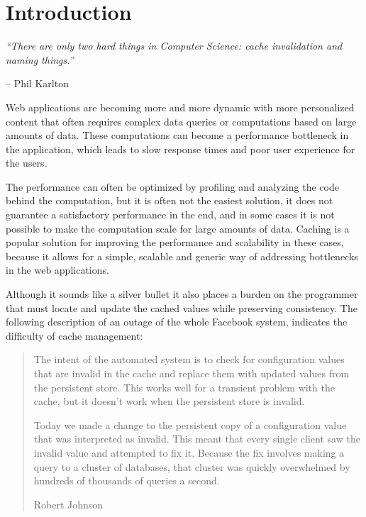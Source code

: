 \chapter{Introduction}

\emph{``There are only two hard things in Computer Science: cache invalidation and naming things.''} \vspace{-1cm}
\begin{flushright}-- Phil Karlton\end{flushright}

Web applications are becoming more and more dynamic with more personalized content that often requires complex data queries or computations based on large amounts of data. These computations can become a performance bottleneck in the application, which leads to slow response times and poor user experience for the users.

The performance can often be optimized by profiling and analyzing the code behind the computation, but it is often not the easiest solution, it does not guarantee a satisfactory performance in the end, and in some cases it is not possible to make the computation scale for large amounts of data. Caching is a popular solution for improving the performance and scalability in these cases, because it allows for a simple, scalable and generic way of addressing bottlenecks in the web applications.

Although it sounds like a silver bullet it also places a burden on the programmer that must locate and update the cached values while preserving consistency. The following description of an outage of the whole Facebook system, indicates the difficulty of cache management:

\begin{quote}
  The intent of the automated system is to check for configuration values that are invalid in the cache and replace them with updated values from the persistent store. This works well for a transient problem with the cache, but it doesn’t work when the persistent store is invalid.

 Today we made a change to the persistent copy of a configuration value that was interpreted as invalid. This meant that every single client saw the invalid value and attempted to fix it. Because the fix involves making a query to a cluster of databases, that cluster was quickly overwhelmed by hundreds of thousands of queries a second.
\begin{flushright}Robert Johnson~\cite{facebook_outage}\end{flushright}
\end{quote}

